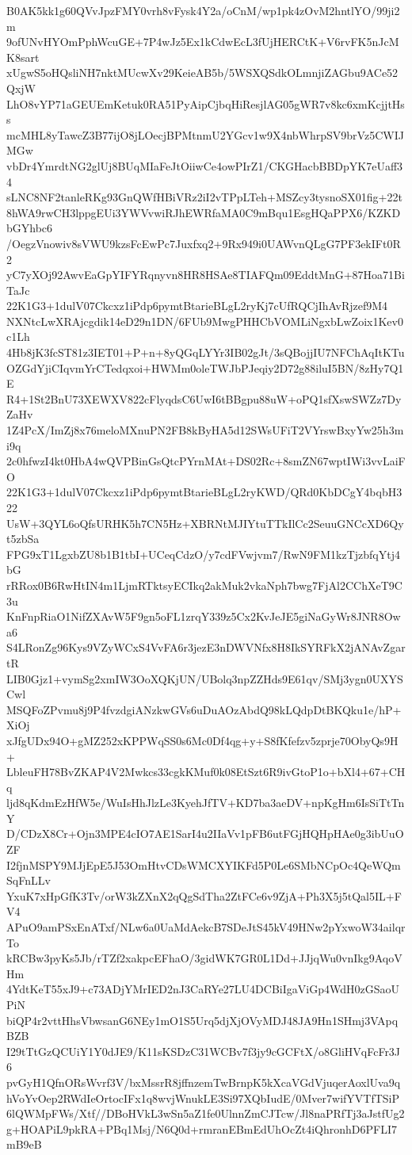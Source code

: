 B0AK5kk1g60QVvJpzFMY0vrh8vFysk4Y2a/oCnM/wp1pk4zOvM2hntlYO/99ji2m
9ofUNvHYOmPphWcuGE+7P4wJz5Ex1kCdwEcL3fUjHERCtK+V6rvFK5nJcMK8sart
xUgwS5oHQsliNH7nktMUcwXv29KeieAB5b/5WSXQSdkOLmnjiZAGbu9ACe52QxjW
LhO8vYP71aGEUEmKetuk0RA51PyAipCjbqHiResjlAG05gWR7v8kc6xmKcjjtHss
mcMHL8yTawcZ3B77ijO8jLOecjBPMtnmU2YGcv1w9X4nbWhrpSV9brVz5CWIJMGw
vbDr4YmrdtNG2glUj8BUqMIaFeJtOiiwCe4owPIrZ1/CKGHacbBBDpYK7eUaff34
sLNC8NF2tanleRKg93GnQWfHBiVRz2iI2vTPpLTeh+MSZcy3tysnoSX01fig+22t
8hWA9rwCH3lppgEUi3YWVvwiRJhEWRfaMA0C9mBqu1EsgHQaPPX6/KZKDbGYhbc6
/OegzVnowiv8sVWU9kzsFcEwPc7Juxfxq2+9Rx949i0UAWvnQLgG7PF3ekIFt0R2
yC7yXOj92AwvEaGpYIFYRqnyvn8HR8HSAe8TIAFQm09EddtMnG+87Hoa71BiTaJc
22K1G3+1dulV07Ckcxz1iPdp6pymtBtarieBLgL2ryKj7cUfRQCjIhAvRjzef9M4
NXNtcLwXRAjcgdik14eD29n1DN/6FUb9MwgPHHCbVOMLiNgxbLwZoix1Kev0c1Lh
4Hb8jK3fcST81z3IET01+P+n+8yQGqLYYr3IB02gJt/3sQBojjIU7NFChAqItKTu
OZGdYjiCIqvmYrCTedqxoi+HWMm0oleTWJbPJeqiy2D72g88iluI5BN/8zHy7Q1E
R4+1St2BnU73XEWXV822cFlyqdsC6UwI6tBBgpu88uW+oPQ1sfXswSWZz7DyZaHv
1Z4PcX/ImZj8x76meloMXnuPN2FB8kByHA5d12SWsUFiT2VYrswBxyYw25h3mi9q
2c0hfwzI4kt0HbA4wQVPBinGsQtcPYrnMAt+DS02Rc+8smZN67wptIWi3vvLaiFO
22K1G3+1dulV07Ckcxz1iPdp6pymtBtarieBLgL2ryKWD/QRd0KbDCgY4bqbH322
UsW+3QYL6oQfsURHK5h7CN5Hz+XBRNtMJIYtuTTkIlCc2SeuuGNCcXD6Qyt5zbSa
FPG9xT1LgxbZU8b1B1tbI+UCeqCdzO/y7cdFVwjvm7/RwN9FM1kzTjzbfqYtj4bG
rRRox0B6RwHtIN4m1LjmRTktsyECIkq2akMuk2vkaNph7bwg7FjAl2CChXeT9C3u
KnFnpRiaO1NifZXAvW5F9gn5oFL1zrqY339z5Cx2KvJeJE5giNaGyWr8JNR8Owa6
S4LRonZg96Kys9VZyWCxS4VvFA6r3jezE3nDWVNfx8H8IkSYRFkX2jANAvZgartR
LIB0Gjz1+vymSg2xmIW3OoXQKjUN/UBolq3npZZHds9E61qv/SMj3ygn0UXYSCwl
MSQFoZPvmu8j9P4fvzdgiANzkwGVs6uDuAOzAbdQ98kLQdpDtBKQku1e/hP+XiOj
xJfgUDx94O+gMZ252xKPPWqSS0s6Mc0Df4qg+y+S8fKfefzv5zprje70ObyQs9H+
LbleuFH78BvZKAP4V2Mwkcs33cgkKMuf0k08EtSzt6R9ivGtoP1o+bXl4+67+CHq
ljd8qKdmEzHfW5e/WuIsHhJlzLe3KyehJfTV+KD7ba3aeDV+npKgHm6IsSiTtTnY
D/CDzX8Cr+Ojn3MPE4cIO7AE1SarI4u2IIaVv1pFB6utFGjHQHpHAe0g3ibUuOZF
I2fjnMSPY9MJjEpE5J53OmHtvCDsWMCXYIKFd5P0Le6SMbNCpOc4QeWQmSqFnLLv
YxuK7xHpGfK3Tv/orW3kZXnX2qQgSdTha2ZtFCe6v9ZjA+Ph3X5j5tQal5IL+FV4
APuO9amPSxEnATxf/NLw6a0UaMdAekcB7SDeJtS45kV49HNw2pYxwoW34ailqrTo
kRCBw3pyKs5Jb/rTZf2xakpcEFhaO/3gidWK7GR0L1Dd+JJjqWu0vnIkg9AqoVHm
4YdtKeT55xJ9+c73ADjYMrIED2nJ3CaRYe27LU4DCBiIgaViGp4WdH0zGSaoUPiN
biQP4r2vttHhsVbwsanG6NEy1mO1S5Urq5djXjOVyMDJ48JA9Hn1SHmj3VApqBZB
I29tTtGzQCUiY1Y0dJE9/K11sKSDzC31WCBv7f3jy9cGCFtX/o8GliHVqFcFr3J6
pvGyH1QfnORsWvrf3V/bxMssrR8jffnzemTwBrnpK5kXcaVGdVjuqerAoxlUva9q
hVoYvOep2RWdIeOrtocIFx1q8wvjWnukLE3Si97XQbIudE/0Mver7wifYVTfTSiP
6lQWMpFWs/Xtf//DBoHVkL3wSn5aZ1fe0UlnnZmCJTcw/Jl8naPRfTj3aJstfUg2
g+HOAPiL9pkRA+PBq1Msj/N6Q0d+rmranEBmEdUhOcZt4iQhronhD6PFLI7mB9eB
